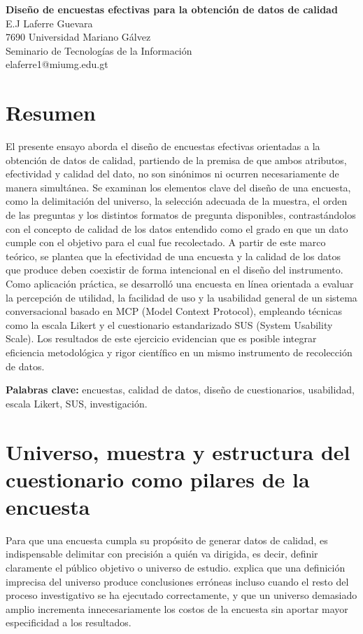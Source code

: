 \documentclass[12pt, letterpaper]{article}
\begin{document}
\RaggedRight%

\begin{center}
    {\bfseries\large Diseño de encuestas efectivas para la obtención de datos de calidad} \\[0.5em]
    {\normalsize E.J Laferre Guevara} \\
    {\normalsize 7690 Universidad Mariano Gálvez} \\
    {\normalsize Seminario de Tecnologías de la Información} \\
    {\normalsize elaferre1@miumg.edu.gt}
\end{center}


\section*{Resumen}
El presente ensayo aborda el diseño de encuestas efectivas orientadas a la obtención de datos de calidad, partiendo de la premisa de que ambos atributos, efectividad y calidad del dato, no son sinónimos ni ocurren necesariamente de manera simultánea. Se examinan los elementos clave del diseño de una encuesta, como la delimitación del universo, la selección adecuada de la muestra, el orden de las preguntas y los distintos formatos de pregunta disponibles, contrastándolos con el concepto de calidad de los datos entendido como el grado en que un dato cumple con el objetivo para el cual fue recolectado. A partir de este marco teórico, se plantea que la efectividad de una encuesta y la calidad de los datos que produce deben coexistir de forma intencional en el diseño del instrumento. Como aplicación práctica, se desarrolló una encuesta en línea orientada a evaluar la percepción de utilidad, la facilidad de uso y la usabilidad general de un sistema conversacional basado en MCP (Model Context Protocol), empleando técnicas como la escala Likert y el cuestionario estandarizado SUS (System Usability Scale). Los resultados de este ejercicio evidencian que es posible integrar eficiencia metodológica y rigor científico en un mismo instrumento de recolección de datos.

\noindent\textbf{Palabras clave:} encuestas, calidad de datos, diseño de cuestionarios, usabilidad, escala Likert, SUS, investigación.

\section*{Universo, muestra y estructura del cuestionario como pilares de la encuesta}
Para que una encuesta cumpla su propósito de generar datos de calidad, es indispensable
delimitar con precisión a quién va dirigida, es decir, definir claramente el público objetivo
o universo de estudio.\parencite{linares2025guia} explica que una definición imprecisa del universo
produce conclusiones erróneas incluso cuando el resto del proceso investigativo se ha ejecutado
correctamente, y que un universo demasiado amplio incrementa innecesariamente los costos de la
encuesta sin aportar mayor especificidad a los resultados.
\end{document}
